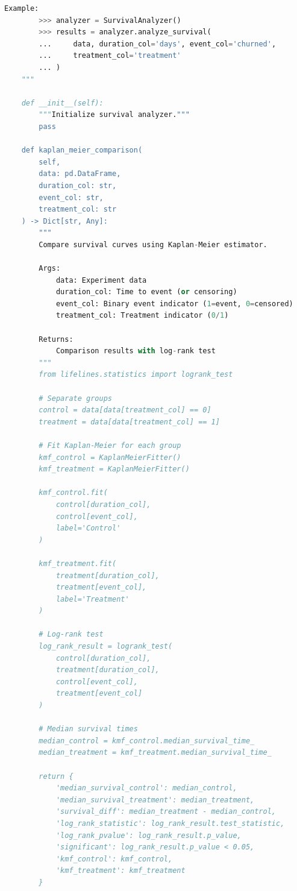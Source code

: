 \begin{lstlisting}[language=Python, caption={Business Metrics Optimization Framework}]
    Example:
        >>> analyzer = SurvivalAnalyzer()
        >>> results = analyzer.analyze_survival(
        ...     data, duration_col='days', event_col='churned',
        ...     treatment_col='treatment'
        ... )
    """

    def __init__(self):
        """Initialize survival analyzer."""
        pass

    def kaplan_meier_comparison(
        self,
        data: pd.DataFrame,
        duration_col: str,
        event_col: str,
        treatment_col: str
    ) -> Dict[str, Any]:
        """
        Compare survival curves using Kaplan-Meier estimator.

        Args:
            data: Experiment data
            duration_col: Time to event (or censoring)
            event_col: Binary event indicator (1=event, 0=censored)
            treatment_col: Treatment indicator (0/1)

        Returns:
            Comparison results with log-rank test
        """
        from lifelines.statistics import logrank_test

        # Separate groups
        control = data[data[treatment_col] == 0]
        treatment = data[data[treatment_col] == 1]

        # Fit Kaplan-Meier for each group
        kmf_control = KaplanMeierFitter()
        kmf_treatment = KaplanMeierFitter()

        kmf_control.fit(
            control[duration_col],
            control[event_col],
            label='Control'
        )

        kmf_treatment.fit(
            treatment[duration_col],
            treatment[event_col],
            label='Treatment'
        )

        # Log-rank test
        log_rank_result = logrank_test(
            control[duration_col],
            treatment[duration_col],
            control[event_col],
            treatment[event_col]
        )

        # Median survival times
        median_control = kmf_control.median_survival_time_
        median_treatment = kmf_treatment.median_survival_time_

        return {
            'median_survival_control': median_control,
            'median_survival_treatment': median_treatment,
            'survival_diff': median_treatment - median_control,
            'log_rank_statistic': log_rank_result.test_statistic,
            'log_rank_pvalue': log_rank_result.p_value,
            'significant': log_rank_result.p_value < 0.05,
            'kmf_control': kmf_control,
            'kmf_treatment': kmf_treatment
        }


\end{lstlisting}
